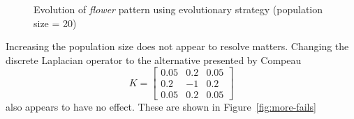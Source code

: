 \begin{figure}[!h]
\centering
            \hfill
            \hfill
            \caption{Evolution of \textit{flower} pattern using evolutionary strategy (population size = 20)}
\label{fig:flower-fail}
\end{figure}

Increasing the population size does not appear to resolve matters. Changing the discrete Laplacian operator to the alternative presented by Compeau\cite{compeau}
\[
  K= \begin{bmatrix}
    0.05 & 0.2 & 0.05\\
    0.2 & -1 & 0.2\\
    0.05 & 0.2 & 0.05
  \end{bmatrix}
\]
also appears to have no effect. These are shown in Figure~\ref{fig:more-fails}\\

